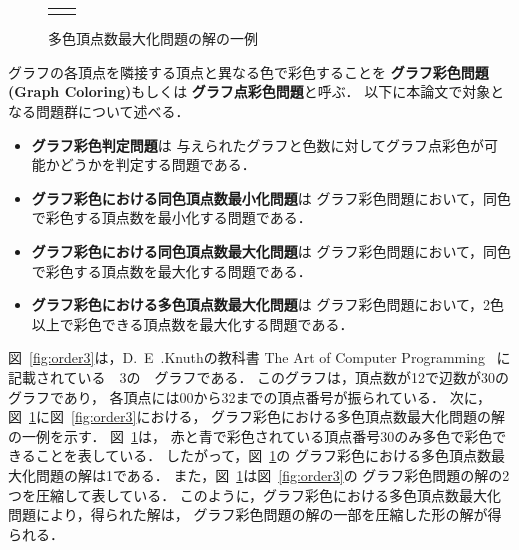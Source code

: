 \begin{figure}[tb]
\begin{tabular}{cc}
\begin{minipage}[t]{0.45\linewidth}
      \caption{多色頂点数最大化問題の解の一例}
      \label{fig:order3mult}
    \end{minipage}
  \end{tabular}
\end{figure}

グラフの各頂点を隣接する頂点と異なる色で彩色することを
\textbf{グラフ彩色問題(Graph Coloring)}もしくは
\textbf{グラフ点彩色問題}と呼ぶ．
以下に本論文で対象となる問題群について述べる．

\begin{itemize}
\item \textbf{グラフ彩色判定問題}は
  与えられたグラフと色数に対してグラフ点彩色が可能かどうかを判定する問題である．
\item \textbf{グラフ彩色における同色頂点数最小化問題}は
  グラフ彩色問題において，同色で彩色する頂点数を最小化する問題である．
\item \textbf{グラフ彩色における同色頂点数最大化問題}は
  グラフ彩色問題において，同色で彩色する頂点数を最大化する問題である．
\item \textbf{グラフ彩色における多色頂点数最大化問題}は
  グラフ彩色問題において，2色以上で彩色できる頂点数を最大化する問題である．
\end{itemize}

図~\ref{fig:order3}は，D.~E~.Knuthの教科書
The Art of Computer Programming~\cite{Knuth:TAOCP:SAT}
に記載されている~~3の~~グラフである．
このグラフは，頂点数が12で辺数が30のグラフであり，
各頂点には00から32までの頂点番号が振られている．
次に，図~\ref{fig:order3mult}に図~\ref{fig:order3}における，
グラフ彩色における多色頂点数最大化問題の解の一例を示す．
図~\ref{fig:order3mult}は，
赤と青で彩色されている頂点番号30のみ多色で彩色できることを表している．
したがって，図~\ref{fig:order3mult}の
グラフ彩色における多色頂点数最大化問題の解は1である．
また，図~\ref{fig:order3mult}は図~\ref{fig:order3}の
グラフ彩色問題の解の2つを圧縮して表している．
このように，グラフ彩色における多色頂点数最大化問題により，得られた解は，
グラフ彩色問題の解の一部を圧縮した形の解が得られる．


